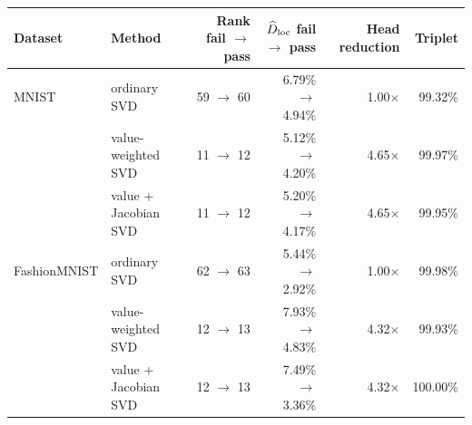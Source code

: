 \begin{tabular}{llrrrr}
\toprule
Dataset & Method & Rank fail $\to$ pass & $\widehat D_{\rm loc}$ fail $\to$ pass & Head reduction & Triplet \\
\midrule
MNIST & ordinary SVD & 59 $\to$ 60 & 6.79\% $\to$ 4.94\% & 1.00$\times$ & 99.32\% \\
 & value-weighted SVD & 11 $\to$ 12 & 5.12\% $\to$ 4.20\% & 4.65$\times$ & 99.97\% \\
 & value + Jacobian SVD & 11 $\to$ 12 & 5.20\% $\to$ 4.17\% & 4.65$\times$ & 99.95\% \\
\addlinespace
FashionMNIST & ordinary SVD & 62 $\to$ 63 & 5.44\% $\to$ 2.92\% & 1.00$\times$ & 99.98\% \\
 & value-weighted SVD & 12 $\to$ 13 & 7.93\% $\to$ 4.83\% & 4.32$\times$ & 99.93\% \\
 & value + Jacobian SVD & 12 $\to$ 13 & 7.49\% $\to$ 3.36\% & 4.32$\times$ & 100.00\% \\
\bottomrule
\end{tabular}
